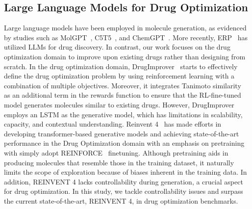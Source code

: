 \subsection{Large Language Models for Drug Optimization}



Large language models have been employed in molecule generation, as evidenced by studies such as MolGPT~\citep{bagal2021molgpt}, C5T5~\citep{rothchild2021c5t5}, and ChemGPT~\citep{frey2023neural}. More recently, ERP~\citep{liu2024erp} has utilized LLMs for drug discovery. In contrast, our work focuses on the drug optimization domain to improve upon existing drugs rather than designing from scratch. In the drug optimization domain, 
DrugImprover~\citep{liu2023drugimprover} starts to effectively define the drug optimization problem by using reinforcement learning with a combination of multiple objectives. Moreover, it integrates Tanimoto similarity~\citep{landrum2016rdkit} as an additional term in the rewards function to ensure that the RL-fine-tuned model generates molecules similar to existing drugs. However, DrugImprover employs an LSTM as the generative model, which has limitations in scalability, capacity, and contextual understanding.
Reinvent 4~\citep{he2021molecular, he2022transformer, loeffler2024reinvent} has made efforts in developing transformer-based generative models and achieving state-of-the-art performance in the Drug Optimization domain with an emphasis on pretraining with simply adopt REINFORCE~\citep{williams1992simple} finetuning. 
Although pretraining aids in producing molecules that resemble those in the training dataset, it naturally limits the scope of exploration because of biases inherent in the training data.
In addition, REINVENT 4 lacks controllability during generation, a crucial aspect for drug optimization. In this study, we tackle controllability issues and surpass the current state-of-the-art, REINVENT 4, in drug optimization benchmarks.